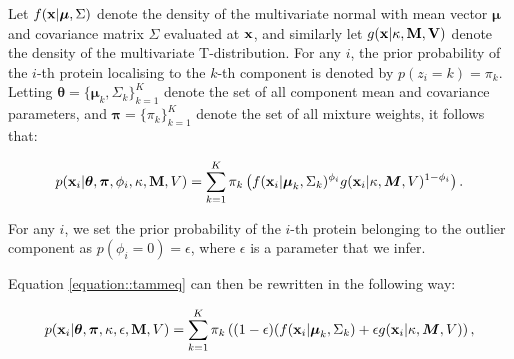 \documentclass[12pt,english]{article}
\begin{document}
Let  $f({\bf x} | \boldsymbol{\mu}, \Sigma)$ denote the density of
the multivariate normal with mean vector $\boldsymbol{\mu}$ and
covariance matrix $\Sigma$ evaluated at ${\bf x}$, and similarly let $g({\bf x | \kappa, \bf{M}, V} )$ denote the density of the multivariate T-distribution. For any $i$, the prior probability of the $i$-th protein localising to the $k$-th component is denoted by $p(z_i = k) = \pi_k$. Letting
$\boldsymbol{\theta} = \{\boldsymbol{\mu}_k, \Sigma_k \}_{k = 1}^K$
denote the set of all component mean and covariance parameters, and
$\boldsymbol{\pi} = \{\pi_k\}_{k = 1}^K$ denote the set of all mixture
weights, it follows that:

\begin{equation} \label{equation::tammeq}
\begin{split}
p({\bf x}_i| \boldsymbol{\theta}, \boldsymbol{\pi} ,\phi_i, \kappa, {\bf M}, V) &=  \sum_{k=1}^{K}\pi_k\left(f({\bf x}_i|\boldsymbol{\mu}_k, \Sigma_k)^{\phi_i}g({\bf x}_i|\kappa, \boldsymbol{M}, V)^{1 - \phi_i }\right).\\
\end{split}
\end{equation}

For any $i$, we set the prior probability of the $i$-th protein
belonging to the outlier component as $p(\phi_i = 0) = \epsilon$, where $\epsilon$ is a parameter that we infer.

Equation \eqref{equation::tammeq}  can then be rewritten in the following way:

\begin{equation}\label{equation::tammepseq}
\begin{split}
p({\bf x}_i| \boldsymbol{\theta}, \boldsymbol{\pi} , \kappa, \epsilon, {\bf M}, V) &=  \sum_{k=1}^{K}\pi_k\left((1-\epsilon)(f({\bf x}_i |\boldsymbol{\mu}_k, \Sigma_k) + \epsilon g({\bf x}_i|\kappa, \boldsymbol{M}, V)\right),\\
\end{split}
\end{equation}
\end{document}

